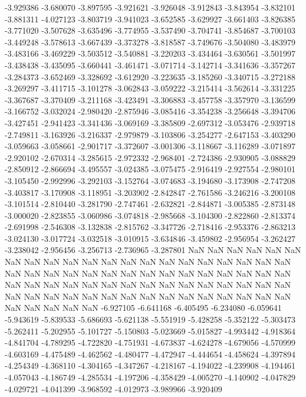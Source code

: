 -3.929386
-3.680070
-3.897595
-3.921621
-3.926048
-3.912843
-3.843954
-3.832101
-3.881311
-4.027123
-3.803719
-3.941023
-3.652585
-3.629927
-3.661403
-3.826385
-3.771020
-3.507628
-3.635496
-3.774955
-3.537490
-3.704741
-3.854687
-3.700103
-3.449248
-3.578613
-3.667439
-3.373278
-3.818587
-3.749676
-3.504080
-3.483979
-3.483166
-3.469229
-3.503512
-3.540881
-3.220203
-3.434464
-3.630561
-3.501997
-3.438438
-3.435095
-3.660441
-3.461471
-3.071714
-3.142714
-3.341636
-3.357267
-3.284373
-3.652469
-3.328692
-3.612920
-3.223635
-3.185260
-3.340715
-3.272188
-3.269297
-3.411715
-3.101278
-3.062843
-3.059222
-3.215414
-3.562614
-3.331225
-3.367687
-3.370409
-3.211168
-3.423491
-3.306883
-3.457758
-3.357970
-3.136599
-3.166752
-3.032024
-2.980420
-2.875946
-3.085416
-3.354238
-3.256648
-3.394706
-3.427451
-2.941423
-3.341436
-3.069169
-3.385809
-2.697312
-3.053476
-2.939718
-2.749811
-3.163926
-3.216337
-2.979879
-3.103806
-3.254277
-2.647153
-3.403290
-3.059663
-3.058661
-2.901717
-3.372607
-3.001306
-3.118667
-3.116289
-3.071897
-2.920102
-2.670314
-3.285615
-2.972332
-2.968401
-2.724386
-2.930905
-3.088829
-2.850912
-2.866694
-3.495557
-3.024385
-3.075475
-2.916419
-2.927554
-2.980101
-3.105450
-2.992996
-3.292103
-3.152764
-3.074683
-3.194680
-3.173908
-2.747208
-3.403817
-3.170908
-3.118951
-3.203902
-2.842847
-2.761586
-3.246216
-3.200108
-3.101514
-2.810440
-3.281790
-2.747461
-2.632821
-2.844871
-3.005385
-2.873148
-3.000020
-2.823855
-3.060986
-3.074818
-2.985668
-3.104300
-2.822860
-2.813374
-2.691998
-2.546308
-3.132838
-2.815762
-3.347726
-2.718416
-2.953376
-2.863213
-3.024130
-3.017724
-3.032518
-3.010915
-3.634846
-3.459802
-2.956954
-3.262427
-3.238042
-2.956456
-3.256713
-2.736965
-3.287801
NaN
NaN
NaN
NaN
NaN
NaN
NaN
NaN
NaN
NaN
NaN
NaN
NaN
NaN
NaN
NaN
NaN
NaN
NaN
NaN
NaN
NaN
NaN
NaN
NaN
NaN
NaN
NaN
NaN
NaN
NaN
NaN
NaN
NaN
NaN
NaN
NaN
NaN
NaN
NaN
NaN
NaN
NaN
NaN
NaN
NaN
NaN
NaN
NaN
NaN
NaN
NaN
NaN
NaN
NaN
NaN
NaN
NaN
NaN
NaN
NaN
NaN
NaN
NaN
NaN
NaN
NaN
NaN
NaN
NaN
NaN
-6.927105
-6.641168
-6.405495
-6.234080
-6.059641
-5.943619
-5.839533
-5.686693
-5.621138
-5.551919
-5.428258
-5.352122
-5.303473
-5.262411
-5.202955
-5.101727
-5.150803
-5.023669
-5.015827
-4.993442
-4.918364
-4.841704
-4.789295
-4.722820
-4.751931
-4.673837
-4.624278
-4.679056
-4.570999
-4.603169
-4.475489
-4.462562
-4.480477
-4.472947
-4.444654
-4.458624
-4.397894
-4.254349
-4.368110
-4.304165
-4.347267
-4.218167
-4.194022
-4.239908
-4.194461
-4.057043
-4.186749
-4.285534
-4.197206
-4.358429
-4.005270
-4.140902
-4.047829
-4.029721
-4.041399
-3.968592
-4.012973
-3.989966
-3.920409
